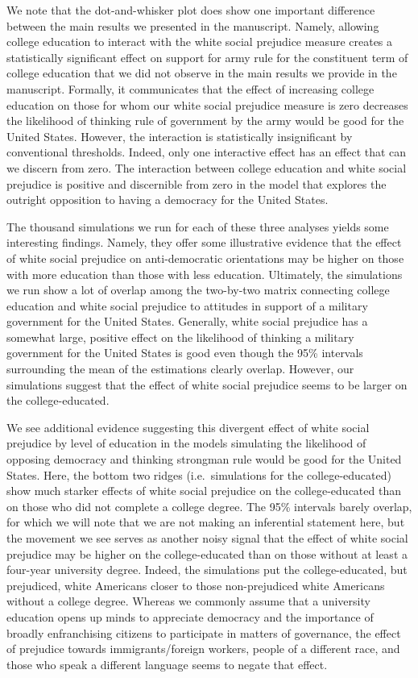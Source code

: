 \documentclass[11pt,]{article}
\begin{document}
We note that the dot-and-whisker plot does show one important difference
between the main results we presented in the manuscript. Namely,
allowing college education to interact with the white social prejudice
measure creates a statistically significant effect on support for army
rule for the constituent term of college education that we did not
observe in the main results we provide in the manuscript. Formally, it
communicates that the effect of increasing college education on those
for whom our white social prejudice measure is zero decreases the
likelihood of thinking rule of government by the army would be good for
the United States. However, the interaction is statistically
insignificant by conventional thresholds. Indeed, only one interactive
effect has an effect that can we discern from zero. The interaction
between college education and white social prejudice is positive and
discernible from zero in the model that explores the outright opposition
to having a democracy for the United States.

The thousand simulations we run for each of these three analyses yields
some interesting findings. Namely, they offer some illustrative evidence
that the effect of white social prejudice on anti-democratic
orientations may be higher on those with more education than those with
less education. Ultimately, the simulations we run show a lot of overlap
among the two-by-two matrix connecting college education and white
social prejudice to attitudes in support of a military government for
the United States. Generally, white social prejudice has a somewhat
large, positive effect on the likelihood of thinking a military
government for the United States is good even though the 95\% intervals
surrounding the mean of the estimations clearly overlap. However, our
simulations suggest that the effect of white social prejudice seems to
be larger on the college-educated.

We see additional evidence suggesting this divergent effect of white
social prejudice by level of education in the models simulating the
likelihood of opposing democracy and thinking strongman rule would be
good for the United States. Here, the bottom two ridges
(i.e.~simulations for the college-educated) show much starker effects of
white social prejudice on the college-educated than on those who did not
complete a college degree. The 95\% intervals barely overlap, for which
we will note that we are not making an inferential statement here, but
the movement we see serves as another noisy signal that the effect of
white social prejudice may be higher on the college-educated than on
those without at least a four-year university degree. Indeed, the
simulations put the college-educated, but prejudiced, white Americans
closer to those non-prejudiced white Americans without a college degree.
Whereas we commonly assume that a university education opens up minds to
appreciate democracy and the importance of broadly enfranchising
citizens to participate in matters of governance, the effect of
prejudice towards immigrants/foreign workers, people of a different
race, and those who speak a different language seems to negate that
effect.
\end{document}
